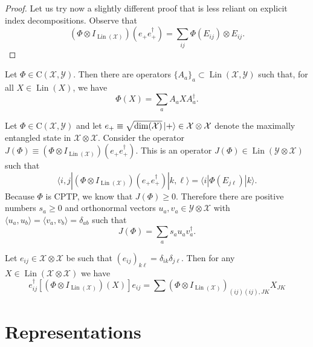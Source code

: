 \documentclass[12pt]{report}
\newcommand{\calY}{{\mathcal{Y}}}
\newcommand{\calX}{{\mathcal{X}}}
\newcommand{\rmC}{{\mathrm{C}}}
\DeclareMathOperator{\Lin}{Lin}
\begin{document}
\begin{proof}
	Let us try now a slightly different proof that is less reliant on explicit index decompositions.
	Observe that
	\begin{equation}
		(\Phi\otimes I_{\Lin(\calX)})(e_+ e_+^\dagger)
		= \sum_{ij} \Phi(E_{ij}) \otimes E_{ij}.
	\end{equation}
\end{proof}


\begin{prop}
	Let $\Phi\in\rmC(\calX,\calY)$. Then there are operators $\{A_a\}_a\subset\Lin(\calX,\calY)$ such that, for all $X\in\Lin(X)$, we have
	\begin{equation}
		\Phi(X) = \sum_a A_a X A_a^\dagger.
	\end{equation}

\end{prop}

Let $\Phi\in\rmC(\calX,\calY)$ and let $e_+\equiv \sqrt{\dim(\calX)}\ket +\in\calX\otimes\calX$ denote the maximally entangled state in $\calX\otimes\calX$.
Consider the operator $J(\Phi)\equiv (\Phi\otimes I_{\Lin(\calX)})(e_+ e_+^\dagger)$.
This is an operator $J(\Phi)\in\Lin(\calY\otimes\calX)$ such that
\begin{equation}
	\langle i,j| (\Phi\otimes I_{\Lin(\calX)})(e_+ e_+^\dagger) |k,\ell\rangle
	= \langle i | \Phi(E_{j\ell}) | k\rangle.
\end{equation}
Because $\Phi$ is CPTP, we know that $J(\Phi)\ge0$.
Therefore there are positive numbers $s_a\ge0$ and orthonormal vectors $u_a,v_a\in\calY\otimes\calX$ with $\langle u_a,u_b\rangle=\langle v_a,v_b\rangle = \delta_{ab}$ such that
\begin{equation}
	J(\Phi) = \sum_a s_a u_a v_a^\dagger.
\end{equation}

Let $e_{ij}\in \calX\otimes\calX$ be such that $(e_{ij})_{k\ell}=\delta_{ik}\delta_{j\ell}$. Then for any $X\in\Lin(\calX\otimes\calX)$ we have
\begin{equation}
	e_{ij}^\dagger  [(\Phi\otimes I_{\Lin(\calX)})(X)] e_{ij}
	= \sum (\Phi\otimes I_{\Lin(\calX)})_{(ij)(ij),JK} X_{JK}
\end{equation}

\section{Representations}
\end{document}
